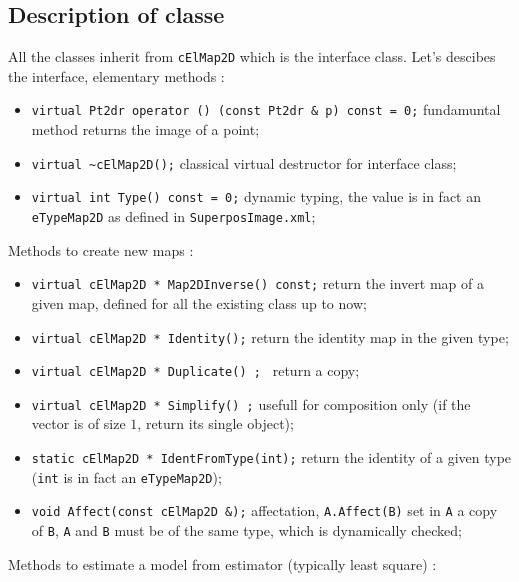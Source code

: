 \subsection{Description of \CPP classe}

All the  \CPP classes inherit from {\tt cElMap2D} which is the interface
class. Let's descibes the interface, elementary methods :

\begin{itemize}
    \item {\tt virtual Pt2dr operator () (const Pt2dr \& p) const = 0;} 
           fundamuntal method returns the image of a point;
    \item {\tt  virtual \~{}cElMap2D();} classical virtual destructor for interface class;
    \item {\tt virtual int Type() const = 0;} dynamic typing, the value is in fact 
          an {\tt eTypeMap2D} as defined in {\tt SuperposImage.xml};
\end{itemize}

Methods to create new maps :

\begin{itemize}
    \item {\tt virtual cElMap2D * Map2DInverse() const;} return the invert map of a given map,
           defined for all the existing class up to now;
    \item {\tt  virtual cElMap2D * Identity();} return the identity  map in the given type;

    \item {\tt     virtual cElMap2D * Duplicate() ; } return a copy;

    \item {\tt    virtual cElMap2D * Simplify() ;} usefull for composition only 
          (if the vector is of size $1$, return its single object);
    \item {\tt static cElMap2D * IdentFromType(int);} return the identity of a given type 
          ({\tt int} is in fact an {\tt eTypeMap2D});
    \item {\tt  void Affect(const cElMap2D \&);} affectation, {\tt A.Affect(B)} set in
          {\tt A} a copy of {\tt B}, {\tt A} and {\tt B} must be of the same type, which
          is dynamically checked;
\end{itemize}

Methods to estimate a model from estimator (typically least square) :

